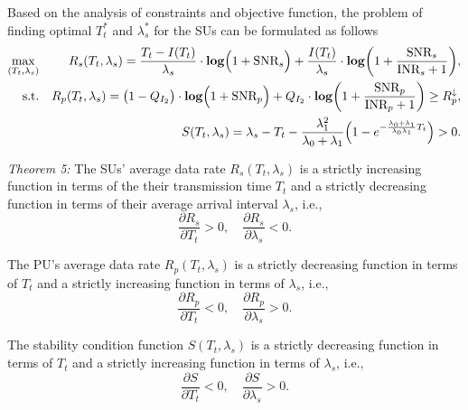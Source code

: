 \documentclass[11pt,draftcls]{IEEEtran}{\onecolumn}
\begin{document}
Based on the analysis of constraints and objective function, the
problem of finding optimal $T_t^\ast$ and $\lambda_s^\ast$ for the
SUs can be formulated as follows
\begin{eqnarray}
\max\limits_{(T_t,\lambda_s)} && R_s(T_t,\lambda_s)=
\frac{T_t-I(T_t)}{\lambda_s}\cdot\mbox{\textbf{log}}\Big(1+\mbox{SNR}_s\Big)
+\frac{I(T_t)}{\lambda_s}\cdot\mbox{\textbf{log}}\bigg(1+\frac{\mbox{SNR}_s}{\mbox{INR}_s+1}\bigg),\nonumber\\
\mbox{s.t.} &&
R_{p}(T_t,\lambda_s)=\big(1-Q_{I_2}\big)\cdot\mbox{\textbf{log}}\Big(1+\mbox{SNR}_p\Big)+Q_{I_2}\cdot
\mbox{\textbf{log}}\bigg(1+\frac{\mbox{SNR}_p}
{\mbox{INR}_p+1}\bigg) \ge
R_{p}^{\downarrow},\\
&&\ S(T_t,\lambda_s)=\lambda_s-T_t-\frac{\lambda_1^2}{\lambda_0+\lambda_1}\Big(1-e^{-\frac{\lambda_0+\lambda_1}{\lambda_0\lambda_1}T_t}\Big) >0.\nonumber
\label{opt}
\end{eqnarray}

\emph{Theorem 5:} The SUs' average data rate $R_s(T_t,\lambda_s)$ is
a strictly increasing function in terms of the their transmission
time $T_t$ and a strictly decreasing function in terms of their
average arrival interval $\lambda_s$, i.e.,
\begin{equation}
\frac{\partial{R_s}}{\partial{T_t}}>0,\quad \frac{\partial{R_s}}{\partial{\lambda_s}}<0.
\end{equation}

The PU's average data rate $R_{p}(T_t,\lambda_s)$ is a strictly
decreasing function in terms of $T_t$ and a strictly increasing
function in terms of $\lambda_s$, i.e.,
\begin{equation}
\frac{\partial{R_p}}{\partial{T_t}}<0,\quad \frac{\partial{R_p}}{\partial{\lambda_s}}>0.
\end{equation}

The stability condition function $S(T_t,\lambda_s)$ is a strictly
decreasing function in terms of $T_t$ and a strictly increasing
function in terms of $\lambda_s$, i.e.,
\begin{equation}
\frac{\partial{S}}{\partial{T_t}}<0,\quad \frac{\partial{S}}{\partial{\lambda_s}}>0.
\end{equation}
\end{document}
